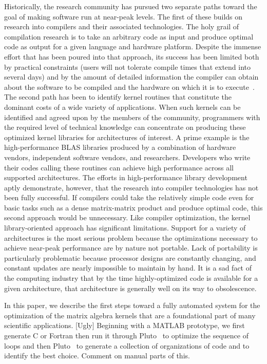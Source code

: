 \documentclass[11pt]{article}
\begin{document}
Historically, the research community has pursued two separate paths toward the goal of making software run at near-peak levels.  The first of these builds on research into compilers and their associated technologies.  The holy grail of compilation research is to take an arbitrary code as input and produce optimal code as output for a given language and hardware platform.  Despite the immense effort that has been poured into that approach, its success has been limited both by practical constraints (users will not tolerate compile times that extend into several days) and by the amount of detailed information the compiler can obtain about the software to be compiled and the hardware on which it is to execute~\cite{Ken99,Wol89,Wol96}.    The second path has been to identify kernel routines that constitute the dominant costs of a wide variety of applications.  When such kernels can be identified and agreed upon by the members of the community, programmers with the required level of technical knowledge can concentrate on producing these optimized kernel libraries for architectures of interest. A prime example is the high-performance BLAS libraries produced by a combination of hardware vendors, independent software vendors, and researchers.  Developers who write their codes calling these routines can achieve high performance across all supported architectures. The efforts in high-performance library development aptly demonstrate, however, that the research into compiler technologies has not been fully successful.  If compilers could take the relatively simple code even for basic tasks such as a dense matrix-matrix product and produce optimal code, this second approach would be unnecessary.    Like compiler optimization, the kernel library-oriented approach has significant limitations.  Support for a variety of architectures is the most serious problem because the optimizations necessary to achieve near-peak performance are by nature not portable.   Lack of portability is particularly problematic because processor designs are constantly changing,  and constant updates are nearly impossible to maintain by hand.  It is a sad fact of the computing industry that by the time highly-optimized code is available for a given architecture, that architecture is generally well on its way to obsolescence.    

In this paper, we describe the first steps toward a fully automated system for the optimization of the matrix algebra kernels that are a foundational part of many scientific applications.    [Ugly] Beginning with a MATLAB prototype, we first generate C or Fortran then run it through Pluto~\cite{} to optimize the sequence of loops and then Pluto~\cite{} to generate a collection of organizations of code and to identify the best choice.   Comment on manual parts of this.
\end{document}
